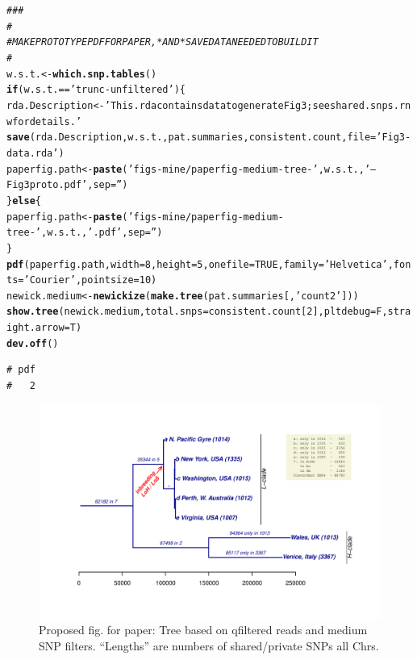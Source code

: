 \documentclass{article}\usepackage[]{graphicx}\usepackage[]{color}
\makeatletter
\newcommand{\hlnum}[1]{\textcolor[rgb]{0.686,0.059,0.569}{#1}}%
\newcommand{\hlstr}[1]{\textcolor[rgb]{0.192,0.494,0.8}{#1}}%
\newcommand{\hlcom}[1]{\textcolor[rgb]{0.678,0.584,0.686}{\textit{#1}}}%
\newcommand{\hlopt}[1]{\textcolor[rgb]{0,0,0}{#1}}%
\newcommand{\hlstd}[1]{\textcolor[rgb]{0.345,0.345,0.345}{#1}}%
\newcommand{\hlkwa}[1]{\textcolor[rgb]{0.161,0.373,0.58}{\textbf{#1}}}%
\newcommand{\hlkwb}[1]{\textcolor[rgb]{0.69,0.353,0.396}{#1}}%
\newcommand{\hlkwc}[1]{\textcolor[rgb]{0.333,0.667,0.333}{#1}}%
\newcommand{\hlkwd}[1]{\textcolor[rgb]{0.737,0.353,0.396}{\textbf{#1}}}%
\newenvironment{kframe}{%
 \def\at@end@of@kframe{}%
 \ifinner\ifhmode%
  \def\at@end@of@kframe{\end{minipage}}%
  \begin{minipage}{\columnwidth}%
 \fi\fi%
 \def\FrameCommand##1{\hskip\@totalleftmargin \hskip-\fboxsep
 \colorbox{shadecolor}{##1}\hskip-\fboxsep
     \hskip-\linewidth \hskip-\@totalleftmargin \hskip\columnwidth}%
 \MakeFramed {\advance\hsize-\width
   \@totalleftmargin\z@ \linewidth\hsize
   \@setminipage}}%
 {\par\unskip\endMakeFramed%
 \at@end@of@kframe}
\newenvironment{knitrout}{}{} %
\makeatother
\begin{document}
\begin{knitrout}\scriptsize
{}\color{fgcolor}\begin{kframe}
\begin{alltt}
\hlcom{###}
\hlcom{#}
\hlcom{# MAKE PROTOTYPE PDF FOR PAPER, *AND* SAVE DATA NEEDED TO BUILD IT}
\hlcom{#}
\hlstd{w.s.t.} \hlkwb{<-} \hlkwd{which.snp.tables}\hlstd{()}
\hlkwa{if}\hlstd{(w.s.t.} \hlopt{==} \hlstr{'trunc-unfiltered'}\hlstd{)\{}
  \hlstd{rda.Description} \hlkwb{<-} \hlstr{'This .rda contains data to generate Fig 3; see shared.snps.rnw for details.'}
  \hlkwd{save}\hlstd{(rda.Description, w.s.t., pat.summaries, consistent.count,} \hlkwc{file}\hlstd{=}\hlstr{'Fig3-data.rda'}\hlstd{)}
  \hlstd{paperfig.path} \hlkwb{<-} \hlkwd{paste}\hlstd{(}\hlstr{'figs-mine/paperfig-medium-tree-'}\hlstd{, w.s.t.,} \hlstr{'--Fig3proto.pdf'}\hlstd{,} \hlkwc{sep}\hlstd{=}\hlstr{''}\hlstd{)}
\hlstd{\}} \hlkwa{else} \hlstd{\{}
  \hlstd{paperfig.path} \hlkwb{<-} \hlkwd{paste}\hlstd{(}\hlstr{'figs-mine/paperfig-medium-tree-'}\hlstd{, w.s.t.,} \hlstr{'.pdf'}\hlstd{,} \hlkwc{sep}\hlstd{=}\hlstr{''}\hlstd{)}
\hlstd{\}}
\hlkwd{pdf}\hlstd{(paperfig.path,} \hlkwc{width}\hlstd{=}\hlnum{8}\hlstd{,}\hlkwc{height}\hlstd{=}\hlnum{5}\hlstd{,}\hlkwc{onefile}\hlstd{=}\hlnum{TRUE}\hlstd{,}\hlkwc{family}\hlstd{=}\hlstr{'Helvetica'}\hlstd{,}\hlkwc{fonts}\hlstd{=}\hlstr{'Courier'}\hlstd{,}\hlkwc{pointsize}\hlstd{=}\hlnum{10}\hlstd{)}
\hlstd{newick.medium} \hlkwb{<-} \hlkwd{newickize}\hlstd{(}\hlkwd{make.tree}\hlstd{(pat.summaries[,}\hlstr{'count2'}\hlstd{]))}
\hlkwd{show.tree}\hlstd{(newick.medium,} \hlkwc{total.snps}\hlstd{=consistent.count[}\hlnum{2}\hlstd{],} \hlkwc{pltdebug}\hlstd{=F,}\hlkwc{straight.arrow}\hlstd{=T)}
\hlkwd{dev.off}\hlstd{()}
\end{alltt}
\begin{verbatim}
# pdf 
#   2
\end{verbatim}
\end{kframe}
\end{knitrout}

\begin{figure}
  \hspace*{-1in}%
  \includegraphics{figs-mine/paperfig-medium-tree-trunc-qfiltered.pdf}
  \caption{Proposed fig. for paper: Tree based on qfiltered reads and medium SNP filters.  ``Lengths'' are numbers of shared/private SNPs all Chrs.}
  \label{fig:tree-paper}
\end{figure}
\end{document}

